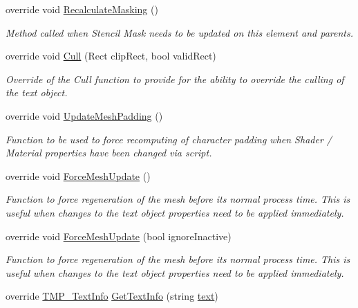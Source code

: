 \begin{DoxyCompactItemize}
override void \mbox{\hyperlink{class_t_m_pro_1_1_text_mesh_pro_u_g_u_i_a51306cc8b5f95caf7a7d8b6127c92fe5}{Recalculate\+Masking}} ()
\begin{DoxyCompactList}\small\item\em Method called when Stencil Mask needs to be updated on this element and parents. \end{DoxyCompactList}\item 
override void \mbox{\hyperlink{class_t_m_pro_1_1_text_mesh_pro_u_g_u_i_aa56357c3d3127f3a3662889ec65118f4}{Cull}} (Rect clip\+Rect, bool valid\+Rect)
\begin{DoxyCompactList}\small\item\em Override of the Cull function to provide for the ability to override the culling of the text object. \end{DoxyCompactList}\item 
override void \mbox{\hyperlink{class_t_m_pro_1_1_text_mesh_pro_u_g_u_i_a7a55d8c0461e66d88ab71cd27bea397f}{Update\+Mesh\+Padding}} ()
\begin{DoxyCompactList}\small\item\em Function to be used to force recomputing of character padding when Shader / Material properties have been changed via script. \end{DoxyCompactList}\item 
override void \mbox{\hyperlink{class_t_m_pro_1_1_text_mesh_pro_u_g_u_i_af5d2e586548f3dd722fd804019261304}{Force\+Mesh\+Update}} ()
\begin{DoxyCompactList}\small\item\em Function to force regeneration of the mesh before its normal process time. This is useful when changes to the text object properties need to be applied immediately. \end{DoxyCompactList}\item 
override void \mbox{\hyperlink{class_t_m_pro_1_1_text_mesh_pro_u_g_u_i_aab2c39e0fc65227e83401eeac525f010}{Force\+Mesh\+Update}} (bool ignore\+Inactive)
\begin{DoxyCompactList}\small\item\em Function to force regeneration of the mesh before its normal process time. This is useful when changes to the text object properties need to be applied immediately. \end{DoxyCompactList}\item 
override \mbox{\hyperlink{class_t_m_pro_1_1_t_m_p___text_info}{T\+M\+P\+\_\+\+Text\+Info}} \mbox{\hyperlink{class_t_m_pro_1_1_text_mesh_pro_u_g_u_i_a8232388d078ad69a9ea241fa15bd2fab}{Get\+Text\+Info}} (string \mbox{\hyperlink{class_t_m_pro_1_1_t_m_p___text_a98a04e5078612c0586472bd510f91f5c}{text}})

\end{DoxyCompactItemize}
